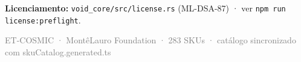 \documentclass[10pt,a4paper,landscape]{article}
\begin{document}
\noindent
\textbf{Licenciamento:} \texttt{void\_core/src/license.rs} (ML-DSA-87) · ver \texttt{npm run license:preflight}.

\vfill
\begin{center}
\small\textcolor{gray}{ET-COSMIC · MontêLauro Foundation · 283 SKUs · catálogo sincronizado com skuCatalog.generated.ts}
\end{center}
\end{document}
